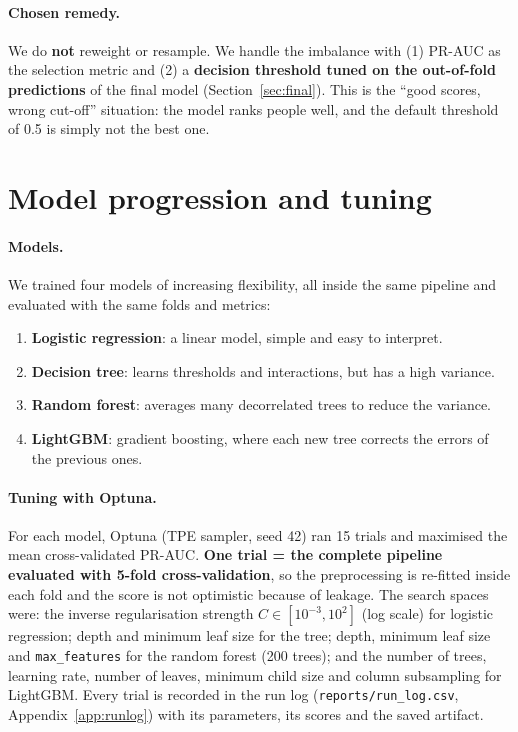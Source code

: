 \documentclass[11pt,a4paper]{article}
\begin{document}
\paragraph{Chosen remedy.}
We do \textbf{not} reweight or resample. We handle the imbalance with (1) PR-AUC as the selection metric and (2) a \textbf{decision threshold tuned on the out-of-fold predictions} of the final model (Section~\ref{sec:final}).
This is the ``good scores, wrong cut-off'' situation: the model ranks people well, and the default threshold of 0.5 is simply not the best one.

\section{Model progression and tuning}
\label{sec:models}

\paragraph{Models.}
We trained four models of increasing flexibility, all inside the same pipeline and evaluated with the same folds and metrics:
\begin{enumerate}
  \item \textbf{Logistic regression}: a linear model, simple and easy to interpret.
  \item \textbf{Decision tree}: learns thresholds and interactions, but has a high variance.
  \item \textbf{Random forest}: averages many decorrelated trees to reduce the variance.
  \item \textbf{LightGBM}: gradient boosting, where each new tree corrects the errors of the previous ones.
\end{enumerate}

\paragraph{Tuning with Optuna.}
For each model, Optuna (TPE sampler, seed 42) ran 15 trials and maximised the mean cross-validated PR-AUC.
\textbf{One trial = the complete pipeline evaluated with 5-fold cross-validation}, so the preprocessing is re-fitted inside each fold and the score is not optimistic because of leakage.
The search spaces were: the inverse regularisation strength $C \in [10^{-3}, 10^{2}]$ (log scale) for logistic regression; depth and minimum leaf size for the tree; depth, minimum leaf size and \texttt{max\_features} for the random forest (200 trees); and the number of trees, learning rate, number of leaves, minimum child size and column subsampling for LightGBM.
Every trial is recorded in the run log (\texttt{reports/run\_log.csv}, Appendix~\ref{app:runlog}) with its parameters, its scores and the saved artifact.
\end{document}
